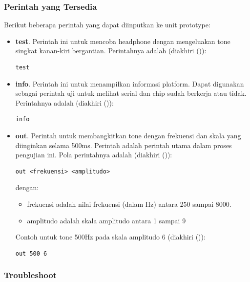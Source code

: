 \documentclass[12pt,]{article}
\begin{document}
	\subsubsection{Perintah yang Tersedia}
	
	Berikut beberapa perintah yang dapat diinputkan ke unit prototype:
	
	\begin{itemize}
		\item \textbf{test}.
		Perintah ini untuk mencoba headphone dengan mengeluakan tone singkat kanan-kiri bergantian.
		Perintahnya adalah (diakhiri (\keys{\return})):
		\begin{verbatim}
test
		\end{verbatim}
		
		\item \textbf{info}.
		Perintah ini untuk menampilkan informasi platform.
		Dapat digunakan sebagai perintah uji untuk melihat serial dan chip sudah berkerja atau tidak.
		Perintahnya adalah (diakhiri (\keys{\return})):
		\begin{verbatim}
info
		\end{verbatim}
		
		\item \textbf{out}.
		Perintah untuk membangkitkan tone dengan frekuensi dan skala yang diinginkan selama 500ms.
		Perintah adalah perintah utama dalam proses pengujian ini.
		Pola perintahnya adalah (diakhiri (\keys{\return})):
		\begin{verbatim}
out <frekuensi> <amplitudo>
		\end{verbatim}
		dengan:
		\begin{itemize}
			\item frekuensi adalah nilai frekuensi (dalam Hz) antara 250 sampai 8000.
			\item amplitudo adalah skala amplitudo antara 1 sampai 9
		\end{itemize}
		Contoh untuk tone 500Hz pada skala amplitudo 6 (diakhiri (\keys{\return})):
		\begin{verbatim}
out 500 6
		\end{verbatim}
	\end{itemize}

	\newpage
	\subsubsection{Troubleshoot}
	
\end{document}
